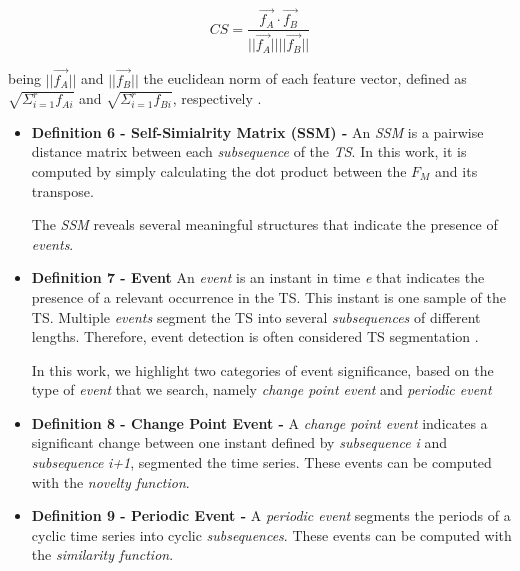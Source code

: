 \begin{equation}
CS = \frac{\vec{f_A} \cdot \vec{f_B}}{||\vec{f_A}|| ||\vec{f_B}||}
\end{equation}

being $||\vec{f_A}||$ and $||\vec{f_B}||$ the euclidean norm of each feature vector, defined as $\sqrt{\Sigma_{i=1}^{r} f_{Ai}}$ and $\sqrt{\Sigma_{i=1}^{r} f_{Bi}}$, respectively \cite{cosine}.









  \begin{itemize}
  
    
    
    This feature set characterizes the TS (MTS) in several dimensions that range from spectral, temporal or statistical. This characterization is used to compute the \textit{self-similarity matrix}.
    
    \item \textbf{Definition 6 - Self-Simialrity Matrix (SSM) - }
    An \textit{SSM} is a pairwise distance matrix between each \textit{subsequence} of the \textit{TS}. In this work, it is computed by simply calculating the dot product between the $F_M$ and its transpose.
    
    The \textit{SSM} reveals several meaningful structures that indicate the presence of \textit{events}.
    
    \item \textbf{Definition 7 - Event} An \textit{event} is an instant in time \textit{e} that indicates the presence of a relevant occurrence in the TS. This instant is one sample of the TS. Multiple \textit{events} segment the TS into several \textit{subsequences} of different lengths. Therefore, event detection is often considered TS segmentation \cite{cpd_alan}.
    
    In this work, we highlight two categories of event significance, based on the type of \textit{event} that we search, namely \textit{change point event} and \textit{periodic event}
    
    \item \textbf{Definition 8 - Change Point Event - } A \textit{change point event} indicates a significant change between one instant defined by \textit{subsequence} \textit{i} and \textit{subsequence} \textit{i+1}, segmented the time series. These events can be computed with the \textit{novelty function}.
    
    \item \textbf{Definition 9 - Periodic Event - } A \textit{periodic event} segments the periods of a cyclic time series into cyclic \textit{subsequences}. These events can be computed with the \textit{similarity function}. 
\end{itemize}



